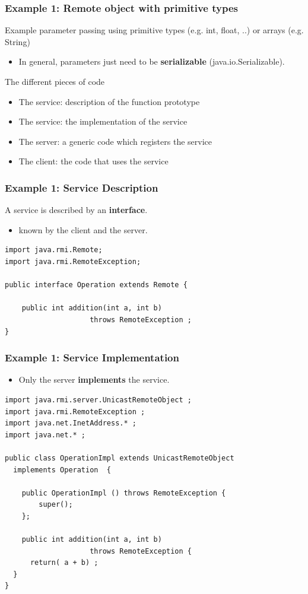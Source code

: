 \documentclass[bigger,hyperref={colorlinks=true, urlcolor=red, plainpages=false, pdfpagelabels, bookmarksnumbered}]{beamer}
\begin{document}
\begin{frame}
\frametitle{Example 1: Remote object with primitive types}
\label{sec-3-7}

Example parameter passing using primitive types (e.g. int, float, ..) or arrays (e.g. String) 
\begin{itemize}
\item In general, parameters just need to be \textbf{serializable} (java.io.Serializable).
\end{itemize}
\begin{block}{The different pieces of code}
\label{sec-3-7-1}

\begin{itemize}
\item The service: description of the function prototype
\item The service: the implementation of the service
\item The server: a generic code which registers the service
\item The client: the code that uses the service
\end{itemize}
\end{block}
\end{frame}
\begin{frame}[fragile]
\frametitle{Example 1: Service Description}
\label{sec-3-8}


A service is described by an \textbf{interface}.
\begin{itemize}
\item known by the client and the server.
\end{itemize}
 

\lstset{language=java}
\begin{lstlisting}
import java.rmi.Remote;
import java.rmi.RemoteException;

public interface Operation extends Remote {

    public int addition(int a, int b) 
                    throws RemoteException ;
}
\end{lstlisting}
\end{frame}
\begin{frame}[fragile]
\frametitle{Example 1: Service Implementation}
\label{sec-3-9}

\begin{itemize}
\item Only the server \textbf{implements} the service.
\end{itemize}

\lstset{language=java}
\begin{lstlisting}
import java.rmi.server.UnicastRemoteObject ;
import java.rmi.RemoteException ;
import java.net.InetAddress.* ;
import java.net.* ;

public class OperationImpl extends UnicastRemoteObject
  implements Operation  {

    public OperationImpl () throws RemoteException {
        super();
    };

    public int addition(int a, int b) 
                    throws RemoteException {
      return( a + b) ;
  }
}
\end{lstlisting}
\end{frame}
\end{document}
